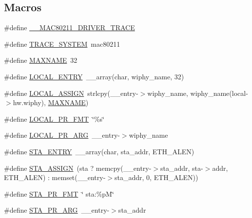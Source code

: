 \subsection*{Macros}
\begin{DoxyCompactItemize}
\item 
\#define \hyperlink{driver-trace_8h_af0133dcc68c991c92720fdb90ee75d3b}{\-\_\-\-\_\-\-M\-A\-C80211\-\_\-\-D\-R\-I\-V\-E\-R\-\_\-\-T\-R\-A\-C\-E}
\item 
\#define \hyperlink{driver-trace_8h_a975ccf160f8e752c8162e389690b0961}{T\-R\-A\-C\-E\-\_\-\-S\-Y\-S\-T\-E\-M}~mac80211
\item 
\#define \hyperlink{driver-trace_8h_ac881f02a50b29d3ffa5b1f4a0e4f9568}{M\-A\-X\-N\-A\-M\-E}~32
\item 
\#define \hyperlink{driver-trace_8h_a70464a6fcf42a8540b6e5b4b5530437f}{L\-O\-C\-A\-L\-\_\-\-E\-N\-T\-R\-Y}~\-\_\-\-\_\-array(char, wiphy\-\_\-name, 32)
\item 
\#define \hyperlink{driver-trace_8h_ab19d9141887ea92ef9640df06a51e0a1}{L\-O\-C\-A\-L\-\_\-\-A\-S\-S\-I\-G\-N}~strlcpy(\-\_\-\-\_\-entry-\/$>$wiphy\-\_\-name, wiphy\-\_\-name(local-\/$>$hw.\-wiphy), \hyperlink{driver-trace_8h_ac881f02a50b29d3ffa5b1f4a0e4f9568}{M\-A\-X\-N\-A\-M\-E})
\item 
\#define \hyperlink{driver-trace_8h_a09833af423135e21ffe99a59ae088cf1}{L\-O\-C\-A\-L\-\_\-\-P\-R\-\_\-\-F\-M\-T}~\char`\"{}\%s\char`\"{}
\item 
\#define \hyperlink{driver-trace_8h_aa2a77a17621ecb4f0b3926fec90a5538}{L\-O\-C\-A\-L\-\_\-\-P\-R\-\_\-\-A\-R\-G}~\-\_\-\-\_\-entry-\/$>$wiphy\-\_\-name
\item 
\#define \hyperlink{driver-trace_8h_a8e20dfda2de8535eb923ec3900c01034}{S\-T\-A\-\_\-\-E\-N\-T\-R\-Y}~\-\_\-\-\_\-array(char, sta\-\_\-addr, E\-T\-H\-\_\-\-A\-L\-E\-N)
\item 
\#define \hyperlink{driver-trace_8h_abbd837b5fc444c0cb48b5954f8ad068a}{S\-T\-A\-\_\-\-A\-S\-S\-I\-G\-N}~(sta ? memcpy(\-\_\-\-\_\-entry-\/$>$sta\-\_\-addr, sta-\/$>$addr, E\-T\-H\-\_\-\-A\-L\-E\-N) \-: memset(\-\_\-\-\_\-entry-\/$>$sta\-\_\-addr, 0, E\-T\-H\-\_\-\-A\-L\-E\-N))
\item 
\#define \hyperlink{driver-trace_8h_a73d0cd445b999888e3f21698b769c843}{S\-T\-A\-\_\-\-P\-R\-\_\-\-F\-M\-T}~\char`\"{} sta\-:\%p\-M\char`\"{}
\item 
\#define \hyperlink{driver-trace_8h_a3b71cc34bae124028f19970a4220d4ab}{S\-T\-A\-\_\-\-P\-R\-\_\-\-A\-R\-G}~\-\_\-\-\_\-entry-\/$>$sta\-\_\-addr
\item 

\end{DoxyCompactItemize}

